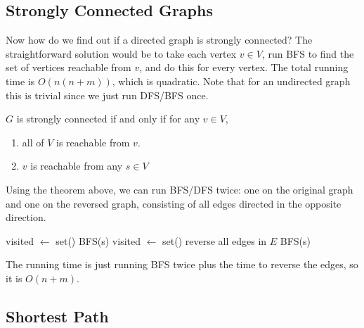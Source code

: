 \subsection{Strongly Connected Graphs}

  Now how do we find out if a directed graph is strongly connected? The straightforward solution would be to take each vertex $v \in V$, run BFS to find the set of vertices reachable from $v$, and do this for every vertex. The total running time is $O(n(n+m))$, which is quadratic. Note that for an undirected graph this is trivial since we just run DFS/BFS once. 

  \begin{theorem}
    $G$ is strongly connected if and only if for any $v \in V$, 
    \begin{enumerate}
      \item all of $V$ is reachable from $v$. 
      \item $v$ is reachable from any $s \in V$
    \end{enumerate}
  \end{theorem}

  \begin{algo}
    Using the theorem above, we can run BFS/DFS twice: one on the original graph and one on the reversed graph, consisting of all edges directed in the opposite direction. 
    \begin{algorithm}[H]
      \label{alg:strongly_connected}
      \begin{algorithmic}[1]
          \State visited $\gets$ set() 
          \State BFS(s) 
            \State {}
          \EndIf
          \State visited $\gets$ set() 
          \State reverse all edges in $E$ 
          \State BFS(s) 
            \State {}
          \EndIf
          \State {}
        \EndFunction
      \end{algorithmic}
    \end{algorithm}
    The running time is just running BFS twice plus the time to reverse the edges, so it is $O(n+m)$. 
  \end{algo}

\subsection{Shortest Path}

